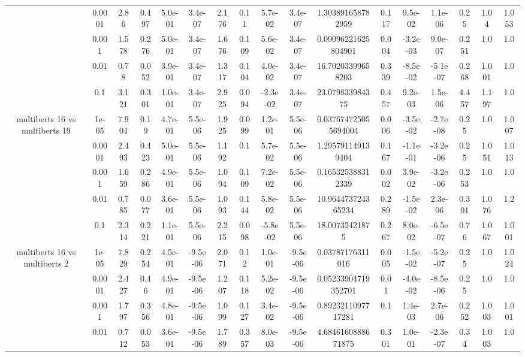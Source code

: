 \begin{tabular}{|c|c|c|c|c|c|c|c|c|c|c|c|c|c|c|c|c|}
 & 0.0001 & 2.86 & 0.497 & 5.0e-01 & 3.4e-07 & 2.176 & 0.11 & 5.7e-02 & 3.4e-07 & 1.303891658782959 & 0.117 & 9.5e-02 & 1.1e-06 & 0.25 & 1.04 & 1.053 \\
 & 0.001 & 1.578 & 0.276 & 5.0e-01 & 3.4e-07 & 1.676 & 0.109 & 5.6e-02 & 3.4e-07 & 0.09096221625804901 & 0.004 & -3.2e-03 & 9.0e-07 & 0.251 & 1.0 & 1.0 \\
 & 0.01 & 0.78 & 0.052 & 3.9e-01 & 3.4e-07 & 1.317 & 0.104 & 4.0e-02 & 3.4e-07 & 16.70203399658203 & 0.339 & -8.5e-02 & -5.1e-07 & 0.268 & 1.001 & 1.0 \\
 & 0.1 & 3.121 & 0.301 & 1.0e-01 & 3.4e-07 & 2.925 & 0.094 & -2.3e-02 & 3.4e-07 & 23.079833984375 & 0.457 & 9.2e-03 & 1.5e-06 & 4.457 & 1.197 & 1.0 \\
\hline
\multirow{5}{*}{multiberts 16 vs multiberts 19} & 1e-05 & 7.904 & 0.19 & 4.7e-01 & 5.5e-06 & 1.925 & 0.099 & 1.2e-01 & 5.5e-06 & 0.037674725055694004 & 0.006 & -3.5e-02 & -2.7e-08 & 0.25 & 1.0 & 1.007 \\
 & 0.0001 & 2.493 & 0.423 & 5.0e-01 & 5.5e-06 & 1.192 & 0.1 & 5.7e-02 & 5.5e-06 & 1.295791149139404 & 0.167 & -1.1e-01 & -3.2e-06 & 0.25 & 1.051 & 1.013 \\
 & 0.001 & 1.659 & 0.286 & 4.9e-01 & 5.5e-06 & 1.094 & 0.109 & 7.2e-02 & 5.5e-06 & 0.165325388312339 & 0.002 & 3.9e-02 & -3.2e-06 & 0.253 & 1.0 & 1.0 \\
 & 0.01 & 0.785 & 0.077 & 3.6e-01 & 5.5e-06 & 1.093 & 0.144 & 5.8e-02 & 5.5e-06 & 10.964473724365234 & 0.289 & -1.5e-02 & 2.3e-06 & 0.301 & 1.076 & 1.2 \\
 & 0.1 & 2.314 & 0.221 & 1.1e-01 & 5.5e-06 & 2.215 & 0.098 & -5.8e-02 & 5.5e-06 & 18.00732421875 & 0.267 & 8.0e-02 & -6.5e-07 & 0.76 & 1.067 & 1.001 \\
\hline
\multirow{5}{*}{multiberts 16 vs multiberts 2} & 1e-05 & 7.829 & 0.254 & 4.5e-01 & -9.5e-06 & 2.071 & 0.12 & 1.0e-01 & -9.5e-06 & 0.03787176311016 & 0.005 & -1.5e-02 & -5.2e-07 & 0.25 & 1.0 & 1.024 \\
 & 0.0001 & 2.427 & 0.46 & 4.9e-01 & -9.5e-06 & 1.207 & 0.118 & 5.2e-02 & -9.5e-06 & 0.05233904719352701 & 0.01 & -4.0e-02 & -8.5e-06 & 0.25 & 1.0 & 1.0 \\
 & 0.001 & 1.797 & 0.356 & 4.8e-01 & -9.5e-06 & 1.099 & 0.127 & 3.4e-02 & -9.5e-06 & 0.8923211097717281 & 0.1 & 1.4e-03 & 2.7e-06 & 0.252 & 1.003 & 1.001 \\
 & 0.01 & 0.712 & 0.053 & 3.6e-01 & -9.5e-06 & 1.789 & 0.357 & 8.0e-03 & -9.5e-06 & 4.6846160888671875 & 0.301 & 1.0e-01 & -2.3e-07 & 0.34 & 1.003 & 1.0 \\

\end{tabular}
